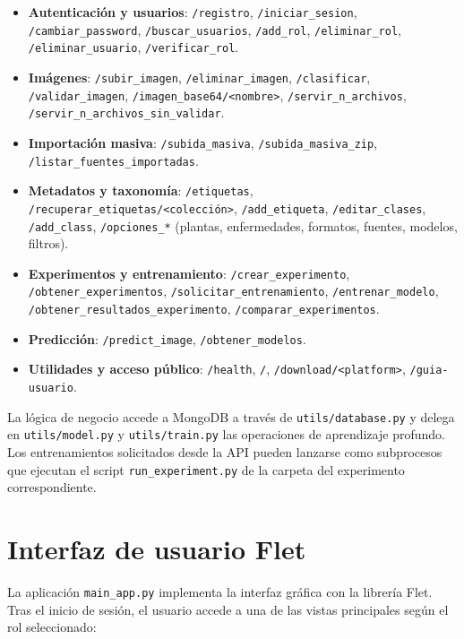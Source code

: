 \documentclass[11pt,spanish,listoffigures,listoftables]{tfgetsinf}
\begin{document}
\begin{itemize}
    \item \textbf{Autenticación y usuarios}: \texttt{/registro}, \texttt{/iniciar\_sesion}, \texttt{/cambiar\_password}, \texttt{/buscar\_usuarios}, \texttt{/add\_rol}, \texttt{/eliminar\_rol}, \texttt{/eliminar\_usuario}, \texttt{/verificar\_rol}.
    \item \textbf{Imágenes}: \texttt{/subir\_imagen}, \texttt{/eliminar\_imagen}, \texttt{/clasificar}, \texttt{/validar\_imagen}, \texttt{/imagen\_base64/<nombre>}, \texttt{/servir\_n\_archivos}, \texttt{/servir\_n\_archivos\_sin\_validar}.
    \item \textbf{Importación masiva}: \texttt{/subida\_masiva}, \texttt{/subida\_masiva\_zip}, \texttt{/listar\_fuentes\_importadas}.
    \item \textbf{Metadatos y taxonomía}: \texttt{/etiquetas}, \texttt{/recuperar\_etiquetas/<colección>}, \texttt{/add\_etiqueta}, \texttt{/editar\_clases}, \texttt{/add\_class}, \texttt{/opciones\_*} (plantas, enfermedades, formatos, fuentes, modelos, filtros).
    \item \textbf{Experimentos y entrenamiento}: \texttt{/crear\_experimento}, \texttt{/obtener\_experimentos}, \texttt{/solicitar\_entrenamiento}, \texttt{/entrenar\_modelo}, \texttt{/obtener\_resultados\_experimento}, \texttt{/comparar\_experimentos}.
    \item \textbf{Predicción}: \texttt{/predict\_image}, \texttt{/obtener\_modelos}.
    \item \textbf{Utilidades y acceso público}: \texttt{/health}, \texttt{/}, \texttt{/download/<platform>}, \texttt{/guia-usuario}.
\end{itemize}

La lógica de negocio accede a MongoDB a través de \texttt{utils/database.py} y delega en \texttt{utils/model.py} y \texttt{utils/train.py} las operaciones de aprendizaje profundo. Los entrenamientos solicitados desde la API pueden lanzarse como subprocesos que ejecutan el script \texttt{run\_experiment.py} de la carpeta del experimento correspondiente.

\section{Interfaz de usuario Flet}

La aplicación \texttt{main\_app.py} implementa la interfaz gráfica con la librería Flet. Tras el inicio de sesión, el usuario accede a una de las vistas principales según el rol seleccionado:
\end{document}
